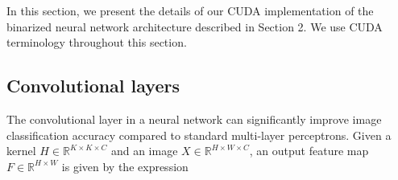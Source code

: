 \documentclass[conference,compsoc]{IEEEtran}
\newcommand{\jani}[1]{\textcolor{red}{\textbf{[Jani: #1]}}}
\newcommand{\response}[1]{\textcolor{darkgreen}{#1}}
\newcommand{\prosaic}[1]{#1}
\newcommand{\expendable}[1]{\textcolor{blue}{\textit{ Exclusively Expendable (#1)}}}
\begin{document}
In this section, we present the details of our CUDA implementation of the binarized neural network architecture described in Section 2. We use CUDA terminology throughout this section.

\subsection{Convolutional layers}




The convolutional layer in a neural network can significantly improve image classification accuracy compared to standard multi-layer perceptrons. Given a kernel $H\in \mathbb{R} ^{K \times K\times C  }$ and an image $ X\in \mathbb{R}^{ H\times W \times C}$, an output feature map $ F \in \mathbb{R}^{ H\times W} $ is given by the expression
\end{document}
